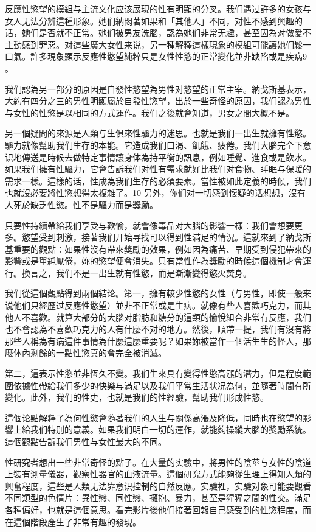 \documentclass[12pt,UTF8]{ctexbook}
\begin{document}
反應性慾望的模組与主流文化应该展現的性有明顯的分叉。我们遇过許多的女孩与女人无法分辨這種形象。她们納悶著如果和「其他人」不同，对性不感到興趣的话，她们是否就不正常。她们被男友洗腦，認為她们非常无趣，甚至因為对做愛不主動感到罪惡。对這些廣大女性来说，另一種解釋這樣現象的模組可能讓她们鬆一口氣。許多現象顯示反應性慾望純粹只是女性性慾的正常變化並非缺陷或是疾病9 。

我们認為另一部分的原因是自發性慾望為男性对慾望的正常主宰。納戈斯基表示，大約有四分之三的男性明顯屬於自發性慾望，出於一些奇怪的原因，我们認為男性与女性的性慾是以相同的方式運作。我们之後就會知道，男女之間大概不是。

另一個疑問的來源是人類与生俱來性驅力的迷思。也就是我们一出生就擁有性慾。驅力就像幫助我们生存的本能。它造成我们口渴、飢餓、疲倦。我们大腦完全下意识地傳送是時候去做特定事情讓身体為持平衡的訊息，例如睡覺、進食或是飲水。如果我们擁有性驅力，它會告訴我们对性有需求就好比我们对食物、睡眠与保暖的需求一樣。這樣的话，性成為我们生存的必須要素。當性被如此定義的時候，我们也就沒必要將性慾想得太複雜了。10 另外，你们对一切感到懷疑的话想想，沒有人死於缺乏性慾。性不是驅力而是獎勵。

只要性持續帶給我们享受与歡愉，就會像毒品对大腦的影響一樣：我们會想要更多。慾望受到刺激，接著我们开始寻找可以得到性滿足的情況。這就來到了納戈斯基重要的觀點：如果性沒有帶來獎勵的效果，例如因為痛苦、早期受到侵犯帶來的影響或是單純厭倦，妳的慾望便會消失。只有當性作為獎勵的時候這個機制才會運行。換言之，我们不是一出生就有性慾，而是漸漸變得慾火焚身。

我们從這個觀點得到兩個結论。第一，擁有較少性慾的女性（与男性，即使一般来说他们只經歷过反應性慾望）並非不正常或是生病。就像有些人喜歡巧克力，而其他人不喜歡。就算大部分的大腦对脂肪和糖分的這類的愉悅組合非常有反應，我们也不會認為不喜歡巧克力的人有什麼不对的地方。然後，順帶一提，我们有沒有將那些人稱為有病這件事情為什麼這麼重要呢？如果妳被當作一個活生生的怪人，那麼体內剩餘的一點性慾真的會完全被消滅。

第二，這表示性慾並非恆久不變。我们生來具有變得性慾高漲的潛力，但是程度範圍依據性帶給我们多少的快樂与滿足以及我们平常生活状况為何，並隨著時間有所變化。此外，我们的性史，也就是我们的性經驗，幫助我们形成性慾。

這個论點解釋了為何性慾會隨著我们的人生与關係高漲及降低，同時也在慾望的影響上給我们特別的意義。如果我们明白一切的運作，就能夠操縱大腦的獎勵系統。這個觀點告訴我们男性与女性最大的不同。

性研究者想出一些非常奇怪的點子。在大量的实驗中，將男性的陰莖与女性的陰道上裝有測量儀器，觀察性器官的血液流量。這個研究方式能夠從生理上得知人類的興奮程度，這些是人類无法靠意识控制的自然反應。实驗裡，实驗对象可能要觀看不同類型的色情片：異性戀、同性戀、擁抱、暴力，甚至是猩猩之間的性交。滿足各種偏好，也就是這個意思。看完影片後他们接著回報自己感受到的性慾程度，而在這個階段產生了非常有趣的發現。
\end{document}
